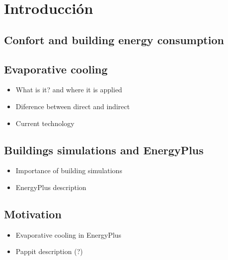 \chapter{Introducción}
\label{chap:introduccion}

 
 
 \section{Confort and building energy consumption}
 
 \section{Evaporative cooling}
 
 \begin{itemize}
 	\item What is it? and where it is applied 
 	\item Diference between direct and indirect
 	\item Current technology
 \end{itemize}
 
 \section{Buildings simulations and EnergyPlus}
  
   \begin{itemize}
 	\item Importance of building simulations
 	\item EnergyPlus description
   \end{itemize}
 
 \section{Motivation}
 
   \begin{itemize}
 	\item Evaporative cooling in EnergyPlus
 	\item Pappit description (?)
   \end{itemize}
